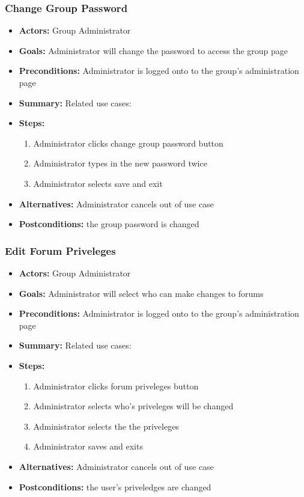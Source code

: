 			\subsubsection{Change Group Password}
			\begin{itemize}
				\item{\textbf{Actors:} Group Administrator}
				\item{\textbf{Goals:} Administrator will change the password to access the group page}
				\item{\textbf{Preconditions:} Administrator is logged onto to the group's administration page}
				\item{\textbf{Summary:} Related use cases:}
				\item{\textbf{Steps:}
				\begin{enumerate}
					\item{Administrator clicks change group password button}
					\item{Administrator types in the new password twice}
					\item{Administrator selects save and exit}
				\end{enumerate}
				}
				\item{\textbf{Alternatives:} Administrator cancels out of use case}
				\item{\textbf{Postconditions:} the group password is changed}
			\end{itemize}
			\subsubsection{Edit Forum Priveleges}
			\begin{itemize}
				\item{\textbf{Actors:} Group Administrator}
				\item{\textbf{Goals:} Administrator will select who can make changes to forums}
				\item{\textbf{Preconditions:} Administrator is logged onto to the group's administration page}
				\item{\textbf{Summary:} Related use cases:}
				\item{\textbf{Steps:}
				\begin{enumerate}
					\item{Administrator clicks forum priveleges button}
					\item{Administrator selects who's priveleges will be changed}
					\item{Administrator selects the the priveleges}
					\item{Administrator saves and exits}
				\end{enumerate}
				}
				\item{\textbf{Alternatives:} Administrator cancels out of use case}
				\item{\textbf{Postconditions:} the user's priveledges are changed}
			\end{itemize}
